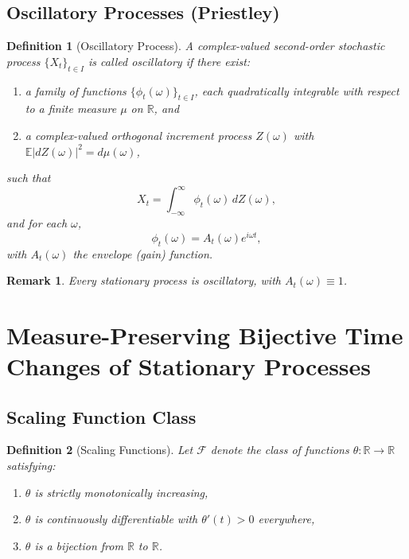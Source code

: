 \documentclass[12pt]{article}
\newtheorem{definition}{Definition}[section]
\newtheorem{remark}{Remark}[section]
\begin{document}
\subsection{Oscillatory Processes (Priestley)} 

\begin{definition}[Oscillatory Process]\label{def:oscillatory}
A complex-valued second-order stochastic process $\{X_t\}_{t \in I}$ is called \emph{oscillatory} if there exist:
\begin{enumerate}[label=(\arabic*)]
    \item a family of functions $\{\phi_t(\omega)\}_{t \in I}$, each quadratically integrable with respect to a finite measure $\mu$ on $\mathbb{R}$, and 
    \item a complex-valued orthogonal increment process $Z(\omega)$ with $\mathbb{E}|dZ(\omega)|^2 = d\mu(\omega)$,
\end{enumerate}
such that
\begin{equation}
    X_t = \int_{-\infty}^{\infty} \phi_t(\omega)\, dZ(\omega),
    \label{eq:oscillatory_proc}
\end{equation}
and for each $\omega$,
\begin{equation}
   \phi_t(\omega) = A_t(\omega) e^{i\omega t}, 
   \label{eq:oscillatory_func}
\end{equation}
with $A_t(\omega)$ the envelope (gain) function.
\end{definition}

\begin{remark}
Every stationary process is oscillatory, with $A_t(\omega)\equiv 1$.
\end{remark}

\section{Measure-Preserving Bijective Time Changes of Stationary Processes}\label{sec:timechange}

\subsection{Scaling Function Class}

\begin{definition}[Scaling Functions]\label{def:scaling_functions}
Let $\mathcal{F}$ denote the class of functions $\theta: \mathbb{R}\to\mathbb{R}$ satisfying:
\begin{enumerate}[label=(\arabic*)]
    \item $\theta$ is strictly monotonically increasing,
    \item $\theta$ is continuously differentiable with $\theta'(t) > 0$ everywhere,
    \item $\theta$ is a bijection from $\mathbb{R}$ to $\mathbb{R}$.
\end{enumerate}
\end{definition}
\end{document}
